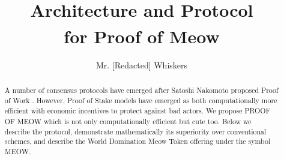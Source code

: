\documentclass[9pt,oneside]{amsart}
\title{\RNum{2020} \compu{} \\ Architecture and Protocol\\ for Proof of Meow\textsuperscript{\textregistered}\\ {\smaller{\textbf{(Draft 1.0.5)}}}}
\author{Mr. [Redacted] Whiskers}
\newcommand*\proofmeow{PROOF OF MEOW\textsuperscript{\textregistered}}
\begin{document}
\begin{abstract}
 A number of consensus protocols have emerged after Satoshi Nakomoto proposed Proof of Work \cite{nakamoto2009bitcoin}. However, Proof of Stake models have emerged as both computationally more efficient with economic incentives to protect against bad actors. We propose \proofmeow{} which is not only computationally efficient but cute too. Below we describe the protocol, demonstrate mathematically its superiority over conventional schemes, and describe the World Domination Meow Token offering under the symbol MEOW.
\end{abstract}

\maketitle
\end{document}
